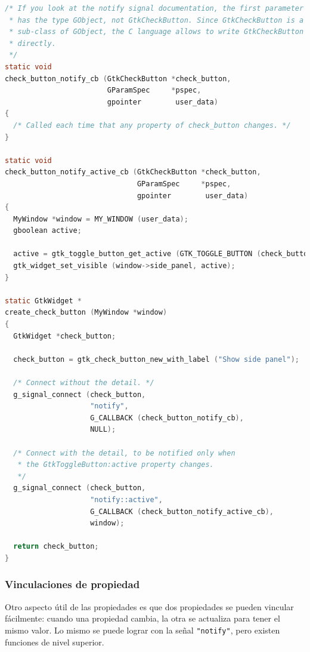 \begin{lstlisting}[language=C, caption={Conexión a la señal de notificación para escuchar cambios en la propiedad.}, label=oop-gobject-connect-to-notify]
/* If you look at the notify signal documentation, the first parameter
 * has the type GObject, not GtkCheckButton. Since GtkCheckButton is a
 * sub-class of GObject, the C language allows to write GtkCheckButton
 * directly.
 */
static void
check_button_notify_cb (GtkCheckButton *check_button,
                        GParamSpec     *pspec,
                        gpointer        user_data)
{
  /* Called each time that any property of check_button changes. */
}

static void
check_button_notify_active_cb (GtkCheckButton *check_button,
                               GParamSpec     *pspec,
                               gpointer        user_data)
{
  MyWindow *window = MY_WINDOW (user_data);
  gboolean active;

  active = gtk_toggle_button_get_active (GTK_TOGGLE_BUTTON (check_button));
  gtk_widget_set_visible (window->side_panel, active);
}

static GtkWidget *
create_check_button (MyWindow *window)
{
  GtkWidget *check_button;

  check_button = gtk_check_button_new_with_label ("Show side panel");

  /* Connect without the detail. */
  g_signal_connect (check_button,
                    "notify",
                    G_CALLBACK (check_button_notify_cb),
                    NULL);

  /* Connect with the detail, to be notified only when
   * the GtkToggleButton:active property changes.
   */
  g_signal_connect (check_button,
                    "notify::active",
                    G_CALLBACK (check_button_notify_active_cb),
                    window);

  return check_button;
}
\end{lstlisting}

\subsubsection{Vinculaciones de propiedad}

Otro aspecto útil de las propiedades es que dos propiedades se pueden vincular fácilmente: cuando una propiedad cambia, la otra se actualiza para tener el mismo valor. Lo mismo se puede lograr con la señal \lstinline{"notify"}, pero existen funciones de nivel superior.

